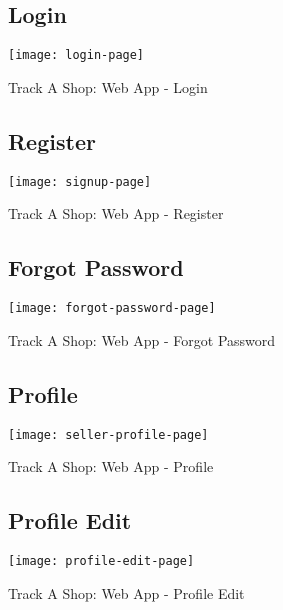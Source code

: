\begin{figure}[h]
	\subsection{Login\\}
	\centering
	\texttt{[image: login-page]}
	\caption{Track A Shop: Web App - Login}
\end{figure}

\vspace{2cm}

\begin{figure}[h]
	\subsection{Register\\}
	\centering
	\texttt{[image: signup-page]}
	\caption{Track A Shop: Web App - Register}
\end{figure}
\newpage

\begin{figure}[h]
	\subsection{Forgot Password\\}
	\centering
	\texttt{[image: forgot-password-page]}
	\caption{Track A Shop: Web App - Forgot Password}
\end{figure}

\vspace{2cm}

\begin{figure}[h]
	\subsection{Profile\\}
	\centering
	\texttt{[image: seller-profile-page]}
	\caption{Track A Shop: Web App - Profile}
\end{figure}
\newpage

\begin{figure}[h]
	\subsection{Profile Edit\\}
	\centering
	\texttt{[image: profile-edit-page]}
	\caption{Track A Shop: Web App - Profile Edit}
\end{figure}

